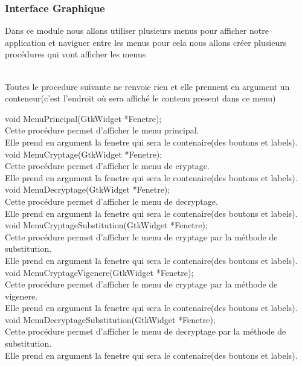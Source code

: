 \documentclass[a4]{article}
\begin{document}
		\subsubsection{Interface Graphique}
		Dans ce module nous allons utiliser plusieurs menus pour afficher notre application et naviguer 
		entre les menus pour cela nous allons créer plusieurs procédures qui vont afficher les menus  
		
		\\
		
		Toutes le procedure suivante ne renvoie rien et elle prennent en argument un conteneur(c'est l'endroit où sera affiché le contenu present dans ce menu)
		
	void MenuPrincipal(GtkWidget *Fenetre);\\
		Cette procédure permet d'afficher le menu principal.\\
		Elle prend en argument la fenetre qui sera le contenaire(des boutons et labels).\\
	
	void MenuCryptage(GtkWidget *Fenetre);\\
		Cette procédure permet d'afficher le menu de cryptage.\\
		Elle prend en argument la fenetre qui sera le contenaire(des boutons et labels).\\

	
	void MenuDecryptage(GtkWidget *Fenetre);\\
		Cette procédure permet d'afficher le menu de decryptage.\\
		Elle prend en argument la fenetre qui sera le contenaire(des boutons et labels).\\

	
	void MenuCryptageSubstitution(GtkWidget *Fenetre);\\
		Cette procédure permet d'afficher le menu de cryptage par la méthode de substitution.\\
		Elle prend en argument la fenetre qui sera le contenaire(des boutons et labels).\\

	
	void MenuCryptageVigenere(GtkWidget *Fenetre);\\
		Cette procédure permet d'afficher le menu de cryptage par la méthode de vigenere.\\
		Elle prend en argument la fenetre qui sera le contenaire(des boutons et labels).\\
	
	void MenuDecryptageSubstitution(GtkWidget *Fenetre);\\
		Cette procédure permet d'afficher le menu de decryptage par la méthode de substitution.\\
		Elle prend en argument la fenetre qui sera le contenaire(des boutons et labels).\\
	
\end{document}
